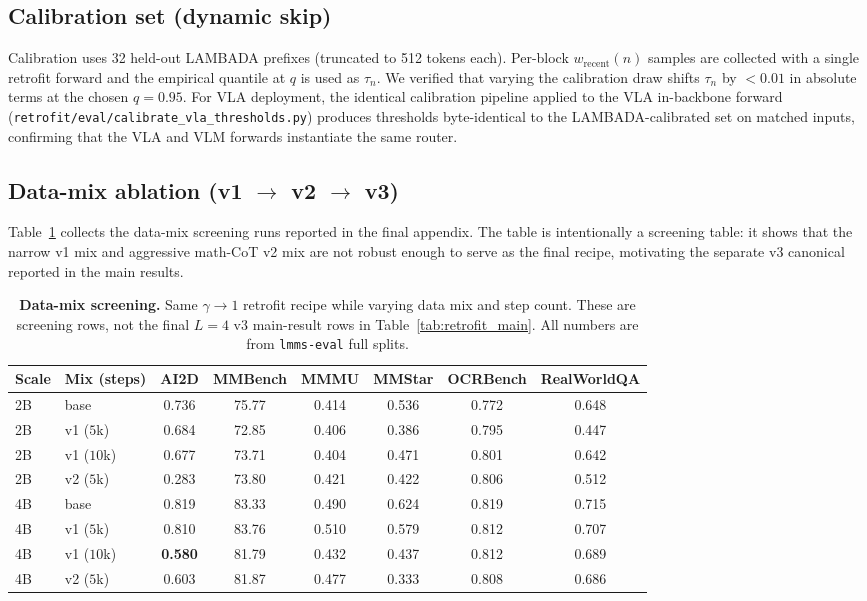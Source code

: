\documentclass{article}
\begin{document}
\subsection{Calibration set (dynamic skip)}
\label{app:calibration}
Calibration uses 32 held-out LAMBADA prefixes (truncated to 512 tokens each). Per-block $w_{\text{recent}}(n)$ samples are collected with a single retrofit forward and the empirical quantile at $q$ is used as $\tau_n$. We verified that varying the calibration draw shifts $\tau_n$ by $<0.01$ in absolute terms at the chosen $q{=}0.95$. For VLA deployment, the identical calibration pipeline applied to the VLA in-backbone forward (\texttt{retrofit/eval/calibrate\_vla\_thresholds.py}) produces thresholds byte-identical to the LAMBADA-calibrated set on matched inputs, confirming that the VLA and VLM forwards instantiate the same router.

\subsection{\texorpdfstring{Data-mix ablation (v1 $\to$ v2 $\to$ v3)}{Data-mix ablation (v1 to v2 to v3)}}
\label{app:data_mix}

Table~\ref{tab:data_mix_ablation} collects the data-mix screening runs reported in the final appendix. The table is intentionally a screening table: it shows that the narrow v1 mix and aggressive math-CoT v2 mix are not robust enough to serve as the final recipe, motivating the separate v3 canonical reported in the main results.

\begin{table}[h]
\caption{\textbf{Data-mix screening.} Same $\gamma{\to}1$ retrofit recipe while varying data mix and step count. These are screening rows, not the final $L{=}4$ v3 main-result rows in Table~\ref{tab:retrofit_main}. All numbers are from \texttt{lmms-eval} full splits.}
\label{tab:data_mix_ablation}
\centering\small
\setlength{\tabcolsep}{4pt}
\begin{tabular}{llcccccc}
\toprule
Scale & Mix (steps) & AI2D & MMBench & MMMU & MMStar & OCRBench & RealWorldQA \\
\midrule
2B & base                  & 0.736 & 75.77 & 0.414 & 0.536 & 0.772 & 0.648 \\
2B & v1 ($5$k)             & 0.684 & 72.85 & 0.406 & 0.386 & 0.795 & 0.447 \\
2B & v1 ($10$k)            & 0.677 & 73.71 & 0.404 & 0.471 & 0.801 & 0.642 \\
2B & v2 ($5$k)             & 0.283 & 73.80 & 0.421 & 0.422 & 0.806 & 0.512 \\
\midrule
4B & base                  & 0.819 & 83.33 & 0.490 & 0.624 & 0.819 & 0.715 \\
4B & v1 ($5$k)             & 0.810 & 83.76 & 0.510 & 0.579 & 0.812 & 0.707 \\
4B & v1 ($10$k)            & \textbf{0.580} & 81.79 & 0.432 & 0.437 & 0.812 & 0.689 \\
4B & v2 ($5$k)             & 0.603 & 81.87 & 0.477 & 0.333 & 0.808 & 0.686 \\
\bottomrule
\end{tabular}
\end{table}
\end{document}
